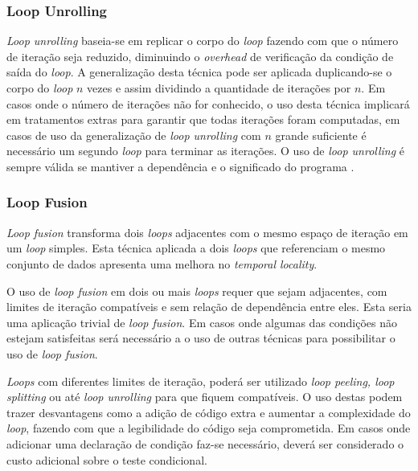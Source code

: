 \documentclass[12pt]{article}
\begin{document}
\subsubsection{Loop Unrolling}

\textit{Loop unrolling} baseia-se em replicar o corpo do \textit{loop} fazendo
com que o número de iteração seja reduzido, diminuindo o \textit{overhead} de
verificação da condição de saída do \textit{loop}.
A generalização desta técnica pode ser aplicada duplicando-se o corpo do
\textit{loop} $n$ vezes e assim dividindo a quantidade de iterações por $n$.
Em casos onde o número de iterações não for conhecido, o uso desta técnica
implicará em tratamentos extras para garantir que todas iterações foram
computadas, em casos de uso da generalização de \textit{loop unrolling} com $n$
grande suficiente é necessário um segundo \textit{loop} para terminar 
as iterações.
O uso de \textit{loop unrolling} é sempre válida se mantiver a
dependência e o significado do programa \cite{Dragomir:2009}.

\subsubsection{Loop Fusion}

\textit{Loop fusion} transforma dois \textit{loops} adjacentes com o mesmo
espaço de iteração em um \textit{loop} simples.
Esta técnica aplicada a dois \textit{loops} que referenciam o mesmo conjunto de
dados apresenta uma melhora no \textit{temporal locality}\cite{Wolf:1996}.

O uso de \textit{loop fusion} em dois ou mais \textit{loops} requer que sejam 
adjacentes, com limites de iteração compatíveis e sem relação de dependência 
entre eles. 
Esta seria uma aplicação trivial de \textit{loop fusion}.
Em casos onde algumas das condições não estejam satisfeitas será necessário a o
uso de outras técnicas para possibilitar o uso de \textit{loop fusion}.

\textit{Loops} com diferentes limites de iteração, poderá ser utilizado
\textit{loop peeling, loop splitting} ou até \textit{loop unrolling} para que
fiquem compatíveis. 
O uso destas podem trazer desvantagens como a adição de código extra e
aumentar a complexidade do \textit{loop}, fazendo com que a legibilidade do
código seja comprometida.
Em casos onde adicionar uma declaração de condição faz-se necessário, deverá ser
considerado o custo adicional sobre o teste condicional.
\end{document}
